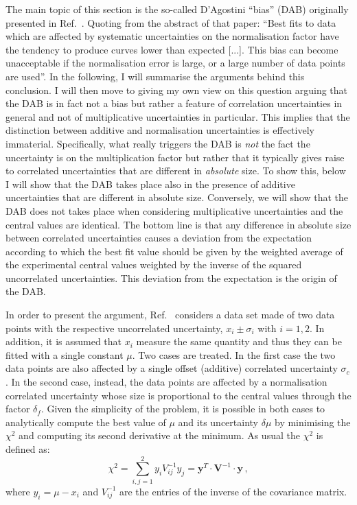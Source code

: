 \documentclass[10pt,a4paper]{article}
\begin{document}
The main topic of this section is the so-called D'Agostini ``bias''
(DAB) originally presented in Ref.~\cite{DAgostini:1993arp}. Quoting
from the abstract of that paper: ``Best fits to data which are
affected by systematic uncertainties on the normalisation factor have
the tendency to produce curves lower than expected [...]. This bias
can become unacceptable if the normalisation error is large, or a
large number of data points are used''. In the following, I will
summarise the arguments behind this conclusion. I will then move to
giving my own view on this question arguing that the DAB is in fact
not a bias but rather a feature of correlation uncertainties in
general and not of multiplicative uncertainties in particular. This
implies that the distinction between additive and normalisation
uncertainties is effectively immaterial. Specifically, what really
triggers the DAB is \textit{not} the fact the uncertainty is on the
multiplication factor but rather that it typically gives raise to
correlated uncertainties that are different in \textit{absolute}
size. To show this, below I will show that the DAB takes place also in
the presence of additive uncertainties that are different in absolute
size. Conversely, we will show that the DAB does not takes place when
considering multiplicative uncertainties and the central values are
identical. The bottom line is that any difference in absolute size
between correlated uncertainties causes a deviation from the
expectation according to which the best fit value should be given by
the weighted average of the experimental central values weighted by
the inverse of the squared uncorrelated uncertainties. This deviation
from the expectation is the origin of the DAB.

In order to present the argument, Ref.~\cite{DAgostini:1993arp}
considers a data set made of two data points with the respective
uncorrelated uncertainty, $x_i\pm\sigma_i$ with $i=1,2$. In addition,
it is assumed that $x_i$ measure the same quantity and thus they can
be fitted with a single constant $\mu$. Two cases are treated. In the
first case the two data points are also affected by a single offset
(additive) correlated uncertainty $\sigma_c$. In the second case,
instead, the data points are affected by a normalisation correlated
uncertainty whose size is proportional to the central values through
the factor $\delta_f$. Given the simplicity of the problem, it is
possible in both cases to analytically compute the best value of $\mu$
and its uncertainty $\delta\mu$ by minimising the $\chi^2$ and
computing its second derivative at the minimum. As usual the $\chi^2$
is defined as:
\begin{equation}
\chi^2 = \sum_{i,j=1}^2y_iV^{-1}_{ij}y_j = \mathbf{y}^T\cdot
\mathbf{V}^{-1}\cdot \mathbf{y}\,,
\end{equation}
where $y_i=\mu-x_i$ and $V^{-1}_{ij}$ are the entries of the inverse
of the covariance matrix.
\end{document}
